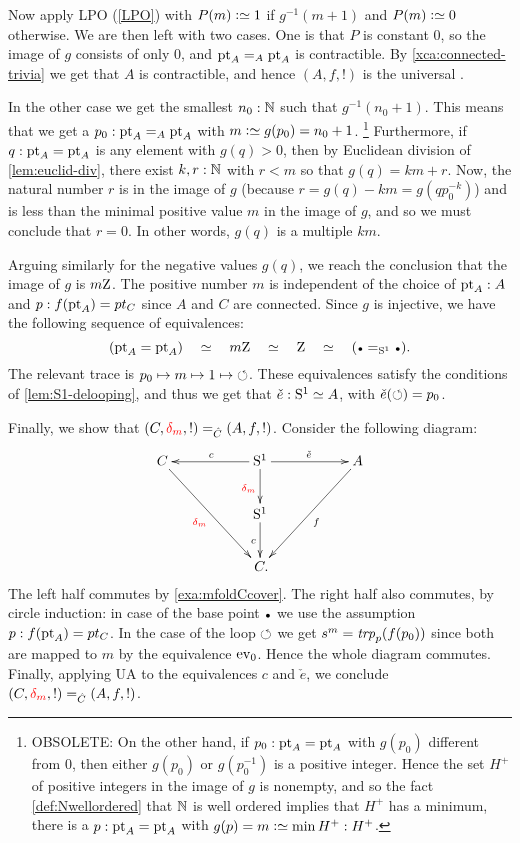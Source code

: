 Now apply LPO (\cref{LPO}) with $P(m)\defeq 1$ if $g^{-1}(m+1)$ and $P(m)\defeq 0$ otherwise.
We are then left with two cases.
One is that $P$ is constant $0$, so the image of $g$ consists of only $0$, 
and $\mathrm{pt}_A=_A\mathrm{pt}_A$ is contractible. By \cref{xca:connected-trivia}
we get that $A$ is contractible, and hence $(A,f,!)$ is the universal \covering.

In the other case we get the smallest $n_0: \mathbb{N}$ such that $g^{-1}(n_0 + 1)$.
This means that we get a $p_0:\mathrm{pt}_A=_A\mathrm{pt}_A$ with $m\defeq g(p_0)=n_0 +1$. 
\footnote{OBSOLETE: On the other hand, if $p_0:\mathrm{pt}_A=\mathrm{pt}_A$ with $g(p_0)$ different from $0$, then either $g(p_0)$ or $g(p_0^{-1})$ is a positive integer.  Hence the set $H^+$ of positive integers in the image of $g$ is nonempty, and so the fact \cref{def:Nwellordered} that $\mathbb{N}$ is well ordered implies that $H^+$ has a minimum, \ie there is a $p:\mathrm{pt}_A=\mathrm{pt}_A$ with  $g(p)=m\defequi\min H^+:H^+$.}
Furthermore, if $q:\mathrm{pt}_A=\mathrm{pt}_A$ is any element with $g(q)>0$, then  by Euclidean division of \cref{lem:euclid-div}, there exist $k,r:\mathbb{N}$ with $r<m$ so that $g(q)=km+r$.  Now, the natural number $r$ is in the image of $g$ (because $r=g(q)-km=g(qp_0^{-k})$) and is less than the minimal positive value $m$ in the image of $g$, and so we must conclude that $r=0$. In other words, $g(q)$ is a multiple $km$.

Arguing similarly for the negative values $g(q)$, we reach the conclusion that the image of $g$ is $m\mathrm{Z}$.
The positive number $m$ is independent of the choice of $\mathrm{pt}_A :A$ and $p: f(\mathrm{pt}_A)=pt_C$ since
$A$ and $C$ are connected. Since $g$ is injective, we have the following
sequence of equivalences:
\[
(\pt_A=\pt_A)\quad \equiv \quad m\zet \quad\equiv\quad \zet\quad \equiv\quad (\base=_{\Sc}\base).
\]
The relevant trace is $p_0 \mapsto m \mapsto 1 \mapsto {\circlearrowleft}$.
These equivalences satisfy the conditions of \cref{lem:S1-delooping},
and thus we get that $\check e: {\mathrm{S}^1}\simeq A$, with $\check e(\circlearrowleft) = p_0$.

Finally, we show that $(C,\dg{m},!) =_{\hat C} (A,f,!)$.
Consider the following diagram:
\[
\xymatrix{
C\ar[ddrr]_{\dg{m}} && 
\ar[d]_{\dg{m}}\ar[ll]_c\Sc\ar[rr]^{\check e} &&
A\ar[ddll]^{f}\\
&&\Sc\ar[d]_c\\
&&\,C.&}
\]
The left half commutes by \cref{exa:mfoldCcover}.
The right half also commutes, by circle induction:
in case of the base point $\base$ we use the assumption $p: f(\mathrm{pt}_A)=pt_C$.
In the case of the loop $\circlearrowleft$ we get $s^m = \trp{p}(f(p_0))$ since both
are mapped to $m$ by the equivalence $\ev_0$. Hence the whole diagram
commutes. Finally, applying UA to the equivalences $c$ and $\check e$,
we conclude $(C,\dg{m},!) =_{\hat C} (A,f,!)$.

